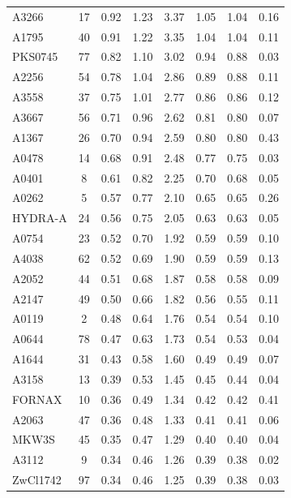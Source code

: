 \documentclass[10pt,aps,pra,reprint,amsmath,amsfonts,amssymb,showpacs,nofootinbib,floatfix]{revtex4-1}
\begin{document}
\begin{table}
\begin{minipage}{2.0\columnwidth}
\begin{tabular}{l  c c c c c c c}
A3266    &  17 &   0.92 &   1.23 &   3.37 &   1.05 &   1.04 &   0.16 \\
A1795    &  40 &   0.91 &   1.22 &   3.35 &   1.04 &   1.04 &   0.11 \\
PKS0745  &  77 &   0.82 &   1.10 &   3.02 &   0.94 &   0.88 &   0.03 \\
A2256    &  54 &   0.78 &   1.04 &   2.86 &   0.89 &   0.88 &   0.11 \\
A3558    &  37 &   0.75 &   1.01 &   2.77 &   0.86 &   0.86 &   0.12 \\
A3667    &  56 &   0.71 &   0.96 &   2.62 &   0.81 &   0.80 &   0.07 \\
A1367    &  26 &   0.70 &   0.94 &   2.59 &   0.80 &   0.80 &   0.43 \\
A0478    &  14 &   0.68 &   0.91 &   2.48 &   0.77 &   0.75 &   0.03 \\
A0401    &   8 &   0.61 &   0.82 &   2.25 &   0.70 &   0.68 &   0.05 \\
A0262    &   5 &   0.57 &   0.77 &   2.10 &   0.65 &   0.65 &   0.26 \\
HYDRA-A  &  24 &   0.56 &   0.75 &   2.05 &   0.63 &   0.63 &   0.05 \\
A0754    &  23 &   0.52 &   0.70 &   1.92 &   0.59 &   0.59 &   0.10 \\
A4038    &  62 &   0.52 &   0.69 &   1.90 &   0.59 &   0.59 &   0.13 \\
A2052    &  44 &   0.51 &   0.68 &   1.87 &   0.58 &   0.58 &   0.09 \\
A2147    &  49 &   0.50 &   0.66 &   1.82 &   0.56 &   0.55 &   0.11 \\
A0119    &   2 &   0.48 &   0.64 &   1.76 &   0.54 &   0.54 &   0.10 \\
A0644    &  78 &   0.47 &   0.63 &   1.73 &   0.54 &   0.53 &   0.04 \\
A1644    &  31 &   0.43 &   0.58 &   1.60 &   0.49 &   0.49 &   0.07 \\
A3158    &  13 &   0.39 &   0.53 &   1.45 &   0.45 &   0.44 &   0.04 \\
FORNAX   &  10 &   0.36 &   0.49 &   1.34 &   0.42 &   0.42 &   0.41 \\
A2063    &  47 &   0.36 &   0.48 &   1.33 &   0.41 &   0.41 &   0.06 \\
MKW3S    &  45 &   0.35 &   0.47 &   1.29 &   0.40 &   0.40 &   0.04 \\
A3112    &   9 &   0.34 &   0.46 &   1.26 &   0.39 &   0.38 &   0.02 \\
ZwCl1742 &  97 &   0.34 &   0.46 &   1.25 &   0.39 &   0.38 &   0.03 \\

\end{tabular}
\end{minipage}
\end{table}
\end{document}
